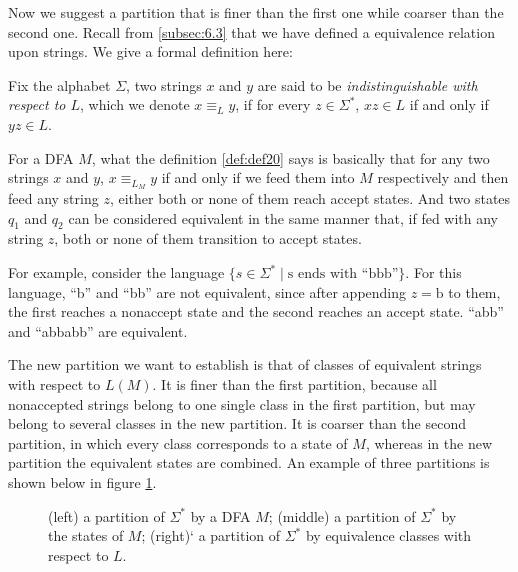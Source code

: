 \documentclass[11pt]{article}
\begin{document}
Now we suggest a partition that is finer than the first one while coarser
than the second one. Recall from \ref{subsec:6.3} that we have defined a
equivalence relation upon strings. We give a formal definition here:

\begin{definition} \label{def:def20}
Fix the alphabet $\Sigma$, two strings $x$ and $y$ are said to be
\emph{indistinguishable with respect to $L$}, which we denote $x \equiv_L y$,
if for every $z \in \Sigma ^\ast$, $xz \in L$ if and only if $yz \in L$.
\end{definition}

For a DFA $M$, what the definition \ref{def:def20} says is basically that
for any two strings $x$ and $y$, $x \equiv_{L_M} y$ if and only if we feed
them into $M$ respectively and then feed any string $z$, either both or none
of them reach accept states. And two states $q_1$ and $q_2$ can be considered
equivalent in the same manner that, if fed with any string $z$, both or none
of them transition to accept states.

For example, consider the language $\{s \in \Sigma^\ast \mid \text{s ends
with ``bbb''}\}$. For this language, ``b'' and ``bb'' are not equivalent, since
after appending $z = \mathrm{b}$ to them, the first reaches a nonaccept state
and the second reaches an accept state. ``abb'' and ``abbabb'' are equivalent.

The new partition we want to establish is that of classes of equivalent
strings with respect to $L(M)$. It is finer than the first partition,
because all nonaccepted strings belong to one single class in the first
partition, but may belong to several classes in the new partition. It is
coarser than the second partition, in which every class corresponds to a
state of $M$, whereas in the new partition the equivalent states are
combined. An example of three partitions is shown below in figure
\ref{fig:fig29}.

\begin{figure}
\centering
{}
\caption{(left) a partition of $\Sigma^\ast$ by a DFA $M$; (middle) a
partition of $\Sigma^\ast$ by the states of $M$; (right)` a partition of
$\Sigma^\ast$ by equivalence classes with respect to $L$.}
\label{fig:fig29}
\end{figure}
\end{document}
